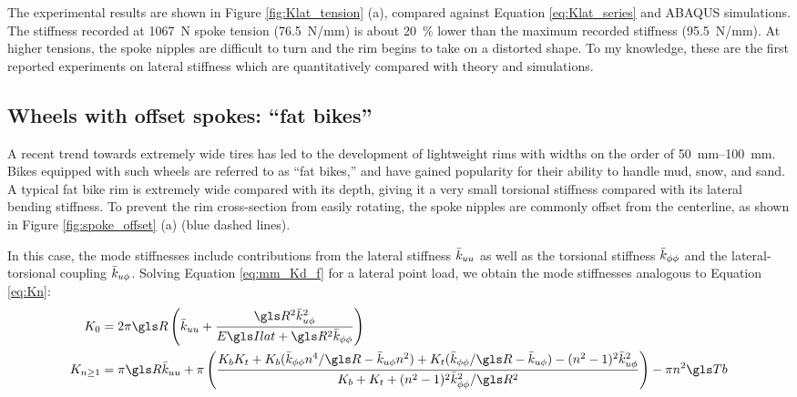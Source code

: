 \documentclass[\rootdir/thesis.tex]{subfiles}
\begin{document}
The experimental results are shown in Figure \ref{fig:Klat_tension} (a), compared against Equation \eqref{eq:Klat_series} and ABAQUS simulations. The stiffness recorded at \SI{1067}{N} spoke tension (\SI{76.5}{N/mm}) is about \SI{20}{\percent} lower than the maximum recorded stiffness (\SI{95.5}{N/mm}). At higher tensions, the spoke nipples are difficult to turn and the rim begins to take on a distorted shape. To my knowledge, these are the first reported experiments on lateral stiffness which are quantitatively compared with theory and simulations.


\subsection{Wheels with offset spokes: ``fat bikes''}

A recent trend towards extremely wide tires has led to the development of lightweight rims with widths on the order of \SIrange{50}{100}{mm}. Bikes equipped with such wheels are referred to as ``fat bikes,'' and have gained popularity for their ability to handle mud, snow, and sand. A typical fat bike rim is extremely wide compared with its depth, giving it a very small torsional stiffness compared with its lateral bending stiffness. To prevent the rim cross-section from easily rotating, the spoke nipples are commonly offset from the centerline, as shown in Figure \ref{fig:spoke_offset} (a) (blue dashed lines).

In this case, the mode stiffnesses include contributions from the lateral stiffness $\bar{k}_{uu}$ as well as the torsional stiffness $\bar{k}_{\phi\phi}$ and the lateral-torsional coupling $\bar{k}_{u\phi}$. Solving Equation \eqref{eq:mm_Kd_f} for a lateral point load, we obtain the mode stiffnesses analogous to Equation \eqref{eq:Kn}:
\begin{subequations}\label{eq:Kn_offset}
\begin{align}
K_0 &= 2\pi\R \left(\kuu + \frac{\R^2\kup^2}{\EIl + \R^2\kpp}\right)\\
K_{n\geq1} & = \pi\R\kuu + \pi\left(\frac{\Kbend \Ktors +
                                          \Kbend(\kpp n^4/\R - \kup n^2) +
                                          \Ktors(\kpp/\R-\kup) -
                                          (n^2-1)^2\kup^2}
                                    {\Kbend + \Ktors + (n^2-1)^2\kpp^2/\R^2}\right)- \pi n^2 \Tb
\end{align}
\end{subequations}
\end{document}
